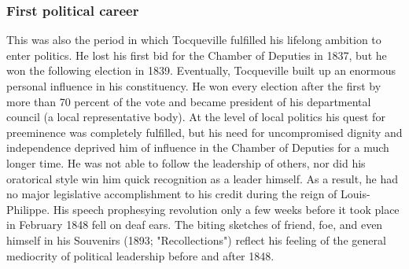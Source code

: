 \documentclass[12pt]{article}
\begin{document}
\subsubsection{First political career}
This was also the period in which Tocqueville fulfilled his lifelong
                                      ambition to enter politics. He lost his first bid for the Chamber of
                                      Deputies in 1837, but he won the following election in 1839.
                                      Eventually, Tocqueville built up an enormous personal influence in his
                                      constituency. He won every election after the first by more than 70
                                      percent of the vote and became president of his departmental council
                                      (a local representative body). At the level of local politics his quest
                                      for preeminence was completely fulfilled, but his need for
                                      uncompromised dignity and independence deprived him of influence in
                                      the Chamber of Deputies for a much longer time. He was not able to
                                      follow the leadership of others, nor did his oratorical style win him
                                      quick recognition as a leader himself. As a result, he had no major
                                      legislative accomplishment to his credit during the reign of
                                      Louis-Philippe. His speech prophesying revolution only a few weeks
                                      before it took place in February 1848 fell on deaf ears. The biting
                                      sketches of friend, foe, and even himself in his Souvenirs (1893;
                                      "Recollections") reflect his feeling of the general mediocrity of
                                      political leadership before and after 1848. 
\end{document}
